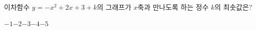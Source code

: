 이차함수 $y=-x^2+2x+3+k$의 그래프가 $x$축과 만나도록 하는 정수 $k$의 최솟값은?
\begin{choices32}{$-1$}{$-2$}{$-3$}{$-4$}{$-5$}\end{choices32}

